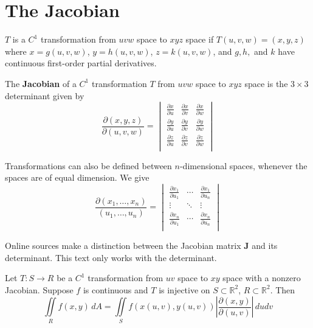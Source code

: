 \section{The Jacobian}
\begin{definition}[\(C^1\) Transformation]
    \(T\) is a \(C^1\) transformation from \(uvw\) space to \(xyz\) space if \(T(u,v,w)=(x,y,z)\) where \(x=g(u,v,w)\), \(y=h(u,v,w)\), \(z=k(u,v,w)\), and \(g,h,\) and \(k\) have continuous first-order partial derivatives.
\end{definition}
\begin{definition}[Jacobian]
    The \textbf{Jacobian} of a \(C^1\) transformation \(T\) from \(uvw\) space to \(xyz\) space is the \(3\times 3\) determinant given by
    \[
        \frac{\partial (x,y,z)}{\partial (u,v,w)}=\begin{vmatrix}
            \frac{\partial x}{\partial u}  &\frac{\partial x}{\partial v}   &\frac{\partial x}{\partial w}    \\[10pt]
             \frac{\partial y}{\partial u} &\frac{\partial y}{\partial v}   &\frac{\partial y}{\partial w}    \\[10pt]
             \frac{\partial z}{\partial u} &\frac{\partial z}{\partial v}   &\frac{\partial z}{\partial w}    \\
        \end{vmatrix}
    \]
\end{definition}
    Transformations can also be defined between \(n\)-dimensional spaces, whenever the spaces are of equal dimension. We give
    \[
        \frac{\partial \left( x_1,\ldots,x_n \right) }{\left( u_1,\ldots,u_n \right) }=\begin{vmatrix}
            \frac{\partial x_1}{\partial u_1}  &\cdots  &\frac{\partial x_1}{\partial u_n}    \\
             \vdots&\ddots  &\vdots   \\
             \frac{\partial x_n}{\partial u_1} &\cdots  &\frac{\partial x_n}{\partial u_n}    \\
        \end{vmatrix}
    \]
\begin{remark}
        Online sources make a distinction between the Jacobian matrix \(\mathbf{J} \) and its determinant. This text only works with the determinant.
\end{remark}
\begin{theorem}
    Let \(T:S\to R\) be a \(C^1\) transformation from \(uv\) space to \(xy\) space with a nonzero Jacobian. Suppose \(f\) is continuous and \(T\) is injective on \(S \subset \mathbb{R}^2\), \(R\subset \mathbb{R} ^2\). Then
    \[
        \iint\limits_{R}f(x,y)\,dA = \iint\limits_{S}f(x(u,v),y(u,v))\left\vert \frac{\partial (x,y)}{\partial (u,v)} \right\vert \,dudv
    \]
\end{theorem}
